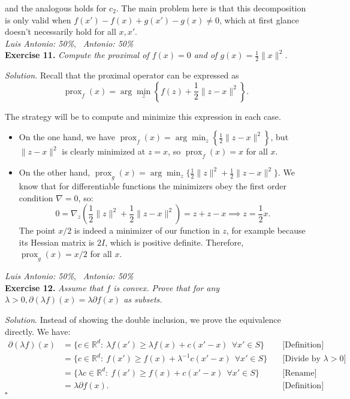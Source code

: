 \documentclass[12pt]{article}
\newcommand*{\QED}{\null\nobreak\hfill\ensuremath{\square}}%
\begin{document}
and the analogous holds for $c_2$. The main problem here is that this decomposition is only valid when $f(x') - f(x) + g(x') - g(x) \neq 0$, which at first glance doesn't necessarily hold for all $x,x'$.\\

\textit{Luis Antonio: 50\%}, \ \textit{Antonio: 50\%}\\
\textbf{Exercise 11. }\emph{Compute the proximal of \( f(x) = 0 \) and of \( g(x) = \frac{1}{2}\|x\|^2 \).}

\emph{Solution.} Recall that the proximal operator can be expressed as
\[ \operatorname{prox}_f(x) = \arg\min_z\left\{f(z) + \frac{1}{2} \|z - x\|^2 \right\}. \]

The strategy will be to compute and minimize this expression in each case.
\begin{itemize}
    \item On the one hand, we have \( \operatorname{prox}_f(x) = \arg\min_z\left\{ \frac{1}{2} \|z - x\|^2 \right\} \), but \( \|z-x\|^2 \) is clearly minimized at \( z = x \), so $\operatorname{prox}_f(x)=x$ for all $x$.
    \item  On the other hand, \( \operatorname{prox}_g(x) = \arg\min_z\{\frac{1}{2}\|z\|^2 + \frac{1}{2} \|z - x\|^2 \}\). We know that for differentiable functions the minimizers obey the first order condition $\nabla =0$, so:
    \[
         0=\nabla_z \left(\frac{1}{2} \|z\|^2 + \frac{1}{2}\|z-x\|^2\right) = z + z - x\implies z = \frac{1}{2}x.
    \]
    The point $x/2$ is indeed a minimizer of our function in $z$, for example because its Hessian matrix is $2I$, which is positive definite. Therefore, \( \operatorname{prox}_g(x) = x/2 \) for all $x$.\\
\end{itemize}

\textit{Luis Antonio: 50\%}, \ \textit{Antonio: 50\%}\\
\textbf{Exercise 12. }\emph{Assume that \( f \)  is convex. Prove that for any \( \lambda > 0, \partial(\lambda f)(x) = \lambda \partial f(x) \) as subsets.}

\emph{Solution}. Instead of showing the double inclusion, we prove the equivalence directly. We have:
\[
    \begin{align*}
     \partial(\lambda f)(x) &= \{c \in \mathbb{R}^d: \ \lambda f(x') \geq \lambda f(x) + c(x' - x)\ \ \forall x' \in S\} \quad &\text{[Definition]}\\
     &= \{c \in \mathbb{R}^d : \  f(x') \geq f(x) + \lambda^{-1} c(x' - x)\ \ \forall x' \in S\}\quad &\text{[Divide by $\lambda>0$]} \\
     &= \{\lambda c \in \mathbb{R}^d : \  f(x') \geq f(x) + c(x' - x)\ \ \forall x' \in S\}\quad &\text{[Rename]} \\
     &= \lambda \partial f(x).\quad &\text{[Definition]}
   \end{align*}
\]
\QED
\end{document}
